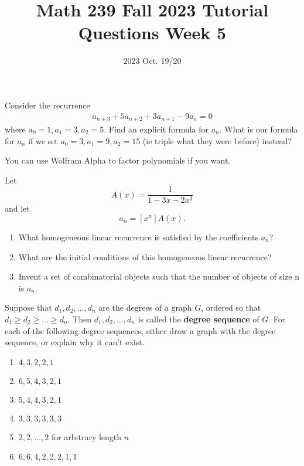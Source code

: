 \title{Math 239 Fall 2023 Tutorial Questions Week 5}

\date{2023 Oct. 19/20}
\maketitle

\begin{enumerate}
     Consider the recurrence
    \begin{align*}
        a_{n+3} + 5 a_{n+2} + 3a_{n+1} - 9a_n = 0
    \end{align*}
    where $a_0 = 1, a_1 = 3, a_2 = 5$. Find an explicit formula for $a_n$. What is our formula for $a_n$ if we set $a_0 =3, a_1 = 9, a_2 = 15$ (ie triple what they were before) instead?
    \begin{note}
        You can use Wolfram Alpha to factor polynomials if you want.
    \end{note}
    
    Let \[A(x) = \frac{1}{1-3x-2x^3}\] 
    and let 
    \[a_n = [x^n]A(x).\]
    \begin{enumerate}
        \item What homogeneous linear recurrence is satisfied by the coefficients $a_n$?
        \item What are the initial conditions of this homogeneous linear recurrence?
        \item Invent a set of combinatorial objects such that the number of objects of size n is $a_n$.
    \end{enumerate}
     Suppose that $d_1, d_2, \dots, d_n$ are the degrees of a graph $G$, ordered so that $d_1 \ge d_2 \ge \dots \ge d_n$. Then $d_1, d_2, \dots, d_n$ is called the \textbf{degree sequence} of $G$. For each of the following degree sequences, either draw a graph with the degree sequence, or explain why it can't exist.
    \begin{enumerate}
        \item $4, 3, 2, 2, 1$
        \item $6, 5, 4, 3, 2, 1$
        \item $5, 4, 4, 3, 2, 1$
        \item $3, 3, 3, 3, 3, 3$
        \item $2, 2, \dots, 2$ for arbitrary length $n$
        \item $6, 6, 4, 2, 2, 2, 1, 1$
    \end{enumerate}



\end{enumerate}
